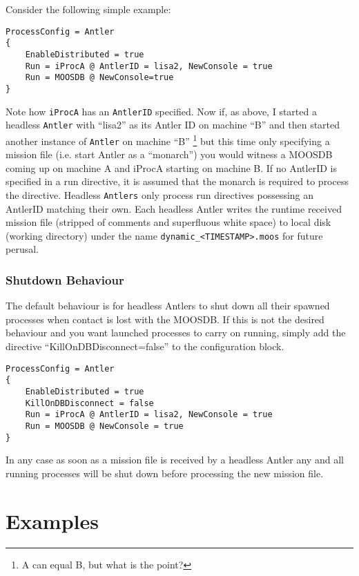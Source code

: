 \documentclass[a4paper,10pt]{article}
\newcommand{\Code}[1]{\texttt{#1} }
\newcommand{\code}[1]{\Code{#1} }
\begin{document}
Consider the following simple example:

\begin{lstlisting}
ProcessConfig = Antler
{
	EnableDistributed = true
	Run = iProcA @ AntlerID = lisa2, NewConsole = true	
	Run = MOOSDB @ NewConsole=true
}
\end{lstlisting}

Note how \code{iProcA} has an \code{AntlerID} specified. Now if, as above, I started a headless \code{Antler} with ``lisa2'' as its Antler ID on machine ``B'' and then started another instance of \code{Antler}  on machine ``B'' \footnote{ A can equal B, but what is the point?} but this time only specifying a mission file (i.e. start Antler as a ``monarch'') you would witness a MOOSDB coming up on machine A and iProcA
starting on machine B. If no AntlerID is specified in a run directive, it is assumed that the monarch is required to  process the directive. Headless \code{Antlers} only process run directives possessing an AntlerID matching their own. Each headless Antler writes the runtime received mission file (stripped of comments and superfluous white space) to local disk (working directory) under the name \code{dynamic\_<TIMESTAMP>.moos} for future perusal.


\subsubsection{Shutdown Behaviour}

The default behaviour is for headless Antlers to shut down all their spawned processes when contact is lost with the MOOSDB. If this is not the desired behaviour and you want launched processes to carry on running, simply add the directive ``KillOnDBDisconnect=false'' to the configuration block.

\begin{lstlisting}
ProcessConfig = Antler
{
	EnableDistributed = true
	KillOnDBDisconnect = false
	Run = iProcA @ AntlerID = lisa2, NewConsole = true	
	Run = MOOSDB @ NewConsole = true
}
\end{lstlisting}

In any case as soon as a mission file is received by a headless Antler any and all running processes will be shut down before processing the new mission file.


\section{Examples}
\end{document}
